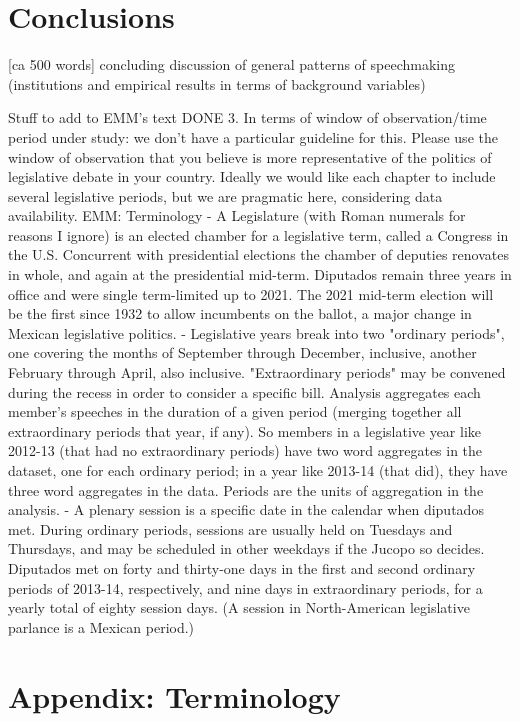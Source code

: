 \documentclass[letter,12pt]{article}
\begin{document}
\section{Conclusions} [ca 500 words]
concluding discussion of general patterns of speechmaking (institutions and empirical results in terms of background variables)


Stuff to add to EMM’s text
DONE 3. In terms of window of observation/time period under study: we don’t have a particular guideline for this. Please use the window of observation that you believe is more representative of the politics of legislative debate in your country. Ideally we would like each chapter to include several legislative periods, but we are pragmatic here, considering data availability.
EMM: Terminology
- A Legislature (with Roman numerals for reasons I ignore) is an elected chamber for a legislative term, called a Congress in the U.S. Concurrent with presidential elections the chamber of deputies renovates in whole, and again at the presidential mid-term. Diputados remain three years in office and were single term-limited up to 2021. The 2021 mid-term election will be the first since 1932 to allow incumbents on the ballot, a major change in Mexican legislative politics.
- Legislative years break into two "ordinary periods", one covering the months of September through December, inclusive, another February through April, also inclusive. "Extraordinary periods" may be convened during the recess in order to consider a specific bill. Analysis aggregates each member's speeches in the duration of a given period (merging together all extraordinary periods that year, if any). So members in a legislative year like 2012-13 (that had no extraordinary periods) have two word aggregates in the dataset, one for each ordinary period; in a year like 2013-14 (that did), they have three word aggregates in the data. Periods are the units of aggregation in the analysis. 
- A plenary session is a specific date in the calendar when diputados met. During ordinary periods, sessions are usually held on Tuesdays and Thursdays, and may be scheduled in other weekdays if the Jucopo so decides. Diputados met on forty and thirty-one days in the first and second ordinary periods of 2013-14, respectively, and nine days in extraordinary periods, for a yearly total of eighty session days. (A session in North-American legislative parlance is a Mexican period.)

\section{Appendix: Terminology}
\end{document}
